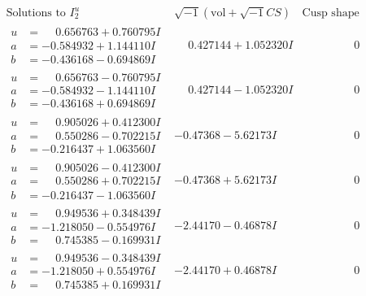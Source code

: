 \documentclass[1p]{elsarticle_modified}
\theoremstyle{definition}
\newcommand{\I}{\sqrt{-1}}
\begin{document}
$$\begin{array}{c|c|c}  
\text{Solutions to }I^u_{2}& \I (\text{vol} + \sqrt{-1}CS) & \text{Cusp shape}\\
 \hline 
\begin{aligned}
u &= \phantom{-}0.656763 + 0.760795 I \\
a &= -0.584932 + 1.144110 I \\
b &= -0.436168 - 0.694869 I\end{aligned}
 & \phantom{-}0.427144 + 1.052320 I & \phantom{-0.000000 } 0 \\ \hline\begin{aligned}
u &= \phantom{-}0.656763 - 0.760795 I \\
a &= -0.584932 - 1.144110 I \\
b &= -0.436168 + 0.694869 I\end{aligned}
 & \phantom{-}0.427144 - 1.052320 I & \phantom{-0.000000 } 0 \\ \hline\begin{aligned}
u &= \phantom{-}0.905026 + 0.412300 I \\
a &= \phantom{-}0.550286 - 0.702215 I \\
b &= -0.216437 + 1.063560 I\end{aligned}
 & -0.47368 - 5.62173 I & \phantom{-0.000000 } 0 \\ \hline\begin{aligned}
u &= \phantom{-}0.905026 - 0.412300 I \\
a &= \phantom{-}0.550286 + 0.702215 I \\
b &= -0.216437 - 1.063560 I\end{aligned}
 & -0.47368 + 5.62173 I & \phantom{-0.000000 } 0 \\ \hline\begin{aligned}
u &= \phantom{-}0.949536 + 0.348439 I \\
a &= -1.218050 - 0.554976 I \\
b &= \phantom{-}0.745385 - 0.169931 I\end{aligned}
 & -2.44170 - 0.46878 I & \phantom{-0.000000 } 0 \\ \hline\begin{aligned}
u &= \phantom{-}0.949536 - 0.348439 I \\
a &= -1.218050 + 0.554976 I \\
b &= \phantom{-}0.745385 + 0.169931 I\end{aligned}
 & -2.44170 + 0.46878 I & \phantom{-0.000000 } 0 \\ \hline\begin{aligned}

\end{aligned}
\end{array}$$
\end{document}
